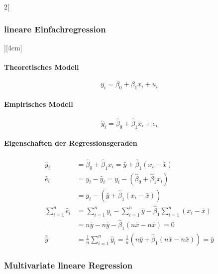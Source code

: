 \documentclass[8pt]{extarticle}
\begin{document}
\begin{multicols}{2}[\subsubsection{lineare Einfachregression}][4cm]

\paragraph{Theoretisches Modell}

$$y_i=\beta_0+\beta_1x_i+u_i$$

\paragraph{Empirisches Modell}

$$\hat{y}_i=\hat{\beta}_0+\hat{\beta}_1x_i+e_i$$

\paragraph{Eigenschaften der Regressionsgeraden}
\begin{equation*}
\begin{split}
\hat{y}_i & = \hat{\beta}_0+\hat{\beta}_1x_i  =\bar{y}+ \hat{\beta}_1(x_i-\bar{x}) \\
\hat{e}_i  & =  y_i-\hat{y}_i = y_i-(\hat{\beta}_0+\hat{\beta}_1x_i) \\
 & =y_i-(\bar{y}+ \hat{\beta}_1(x_i-\bar{x})) \\
\sum\limits_{i=1}^n\hat{e}_i & = \sum\limits_{i=1}^ny_i-\sum\limits_{i=1}^n\bar{y}-\hat{\beta}_1\sum\limits_{i=1}^n(x_i-\bar{x}) \\
 & = n\bar{y}-n\bar{y}-\hat{\beta}_1(n\bar{x}-n\bar{x})=0 \\
\bar{\hat{y}} & = \frac{1}{n}\sum\limits_{i=1}^n\hat{y}_i=\frac{1}{n}(n\bar{y}+\hat{\beta}_1(n\bar{x} - n\bar{x})) = \bar{y}
\end{split}
\end{equation*}



\end{multicols}

\subsubsection{Multivariate lineare Regression}

\end{document}
